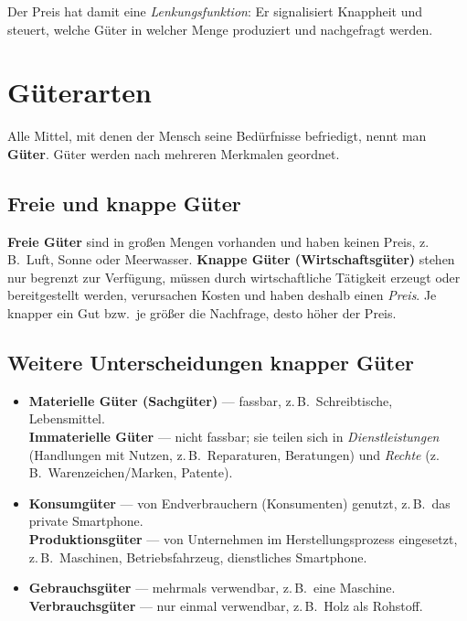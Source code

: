 \documentclass[11pt, a4paper]{article}
\begin{document}
Der Preis hat damit eine \emph{Lenkungsfunktion}: Er signalisiert Knappheit und steuert,
welche Güter in welcher Menge produziert und nachgefragt werden.

\section{Güterarten}

Alle Mittel, mit denen der Mensch seine Bedürfnisse befriedigt, nennt man \textbf{Güter}.
Güter werden nach mehreren Merkmalen geordnet.

\subsection{Freie und knappe Güter}

\textbf{Freie Güter} sind in großen Mengen vorhanden und haben keinen Preis, z.\,B.\ Luft,
Sonne oder Meerwasser. \textbf{Knappe Güter (Wirtschaftsgüter)} stehen nur begrenzt zur
Verfügung, müssen durch wirtschaftliche Tätigkeit erzeugt oder bereitgestellt werden,
verursachen Kosten und haben deshalb einen \emph{Preis}. Je knapper ein Gut bzw.\ je größer
die Nachfrage, desto höher der Preis.

\subsection{Weitere Unterscheidungen knapper Güter}

\begin{itemize}
  \item \textbf{Materielle Güter (Sachgüter)} --- fassbar, z.\,B.\ Schreibtische,
    Lebensmittel. \\
    \textbf{Immaterielle Güter} --- nicht fassbar; sie teilen sich in \emph{Dienstleistungen}
    (Handlungen mit Nutzen, z.\,B.\ Reparaturen, Beratungen) und \emph{Rechte}
    (z.\,B.\ Warenzeichen/Marken, Patente).
  \item \textbf{Konsumgüter} --- von Endverbrauchern (Konsumenten) genutzt, z.\,B.\ das
    private Smartphone. \\
    \textbf{Produktionsgüter} --- von Unternehmen im Herstellungsprozess eingesetzt,
    z.\,B.\ Maschinen, Betriebsfahrzeug, dienstliches Smartphone.
  \item \textbf{Gebrauchsgüter} --- mehrmals verwendbar, z.\,B.\ eine Maschine. \\
    \textbf{Verbrauchsgüter} --- nur einmal verwendbar, z.\,B.\ Holz als Rohstoff.
\end{itemize}
\end{document}
